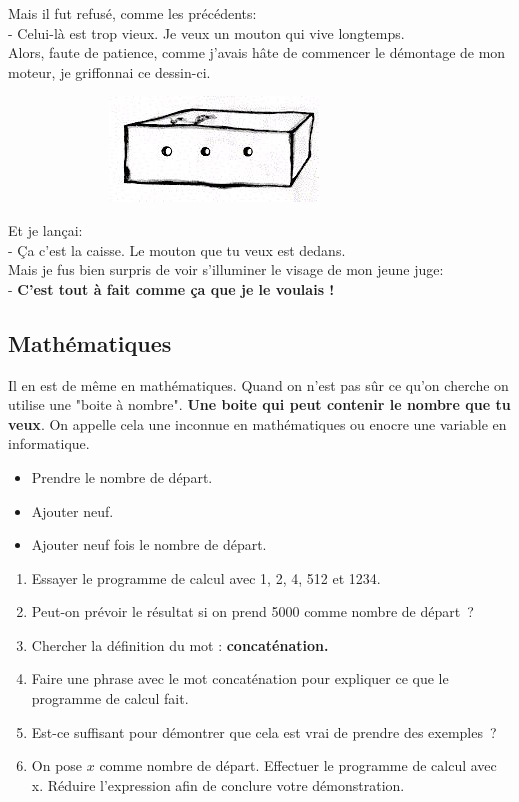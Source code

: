 \documentclass[12pt]{article}
\begin{document}
\begin{multicols}{2}
  Mais il fut refusé, comme les précédents: \\
  - Celui-là est trop vieux. Je veux un mouton qui vive longtemps. \\
  Alors, faute de patience, comme j'avais hâte de commencer le démontage de mon moteur, je griffonnai ce dessin-ci.
  
  \begin{figure}[H]
        \centering
        \includegraphics[width=0.5\linewidth]{3x2-calcul-litteral-1/sources/dm-mouton4.png}
  \end{figure}

  Et je lançai: \\
  - Ça c'est la caisse. Le mouton que tu veux est dedans. \\
  Mais je fus bien surpris de voir s'illuminer le visage de mon jeune juge: \\
  - \textbf{C'est tout à fait comme ça que je le voulais ! }
\end{multicols}

\subsection*{Mathématiques}
Il en est de même en mathématiques. Quand on n’est pas sûr ce qu’on cherche on utilise une "boite à nombre". \textbf{Une boite qui peut contenir le nombre que tu veux}. On appelle cela une inconnue en mathématiques ou enocre une variable en informatique. 

\begin{itemize}
  \item Prendre le nombre de départ.
  \item Ajouter neuf.
  \item Ajouter neuf fois le nombre de départ.
\end{itemize}

\begin{enumerate}
  \item Essayer le programme de calcul avec 1, 2, 4, 512 et 1234.
  \item Peut-on prévoir le résultat si on prend 5000 comme nombre de départ ?
  \item Chercher la définition du mot : \textbf{concaténation.}
  \item Faire une phrase avec le mot concaténation pour expliquer ce que le programme de calcul fait.
  \item Est-ce suffisant pour démontrer que cela est vrai de prendre des exemples ?
  \item On pose $x$ comme nombre de départ. Effectuer le programme de calcul avec x. Réduire l’expression afin de conclure votre démonstration.
\end{enumerate}

\newpage

\Pointilles[101]
\end{document}
